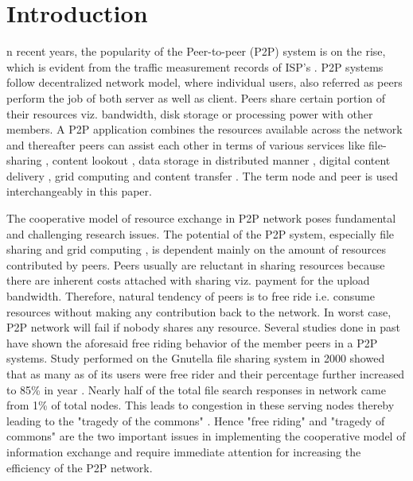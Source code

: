 \documentclass[journal]{IEEEtran}
\begin{document}
\section{Introduction}

n recent years, the popularity of the {P}{eer}-to-peer (P2P) system is on the rise, which is  evident from the traffic measurement records of ISP's \cite{eMule}\cite{Kazza}\cite{BitTorrent}. P2P systems follow decentralized network model, where individual users, also referred as peers perform the job of  both server as well as client. Peers share certain portion of their resources  viz. bandwidth, disk storage or processing power with other members. A P2P application combines the resources available across the network and thereafter peers can assist each other in terms of various services like file-sharing \cite{FileSharing}, content lookout \cite{content_search_1}\cite{content_search_2}\cite{content_search_3}\cite{content_search_4}, data storage in distributed manner \cite{DataStorage}, digital content delivery \cite{ContentDelivery}, grid computing \cite{GridComputing} and content transfer \cite{anonymous_transfer}. The term node and peer is used interchangeably in this paper.


The cooperative model of resource exchange in P2P network poses fundamental and challenging research issues. The potential of the P2P system, especially file sharing \cite{FileSharing} and grid computing \cite{GridComputing}, is dependent mainly on the amount of resources contributed by peers. Peers usually are reluctant in sharing resources because there are inherent costs attached with sharing viz. payment for the upload bandwidth. Therefore, natural tendency of peers is to free ride i.e. consume resources without making any contribution back to the network. In worst case, P2P network will fail if nobody shares any resource. Several studies done in past have shown the aforesaid free riding behavior of the member peers in a P2P systems.  Study performed on the Gnutella file sharing system in 2000 \cite{Adar} showed that as many as  of its users were free rider and their percentage further increased to 85\% \cite{Hughes} in year . Nearly half of the total file search responses in network came from 1\% of total nodes. This leads to congestion in these serving nodes thereby leading to the "tragedy of the commons" \cite{tragedyofcommon}. Hence "free riding" and "tragedy of commons" are the two important issues in implementing the cooperative model of information exchange and require immediate attention for increasing the efficiency of the P2P network.
\end{document}
